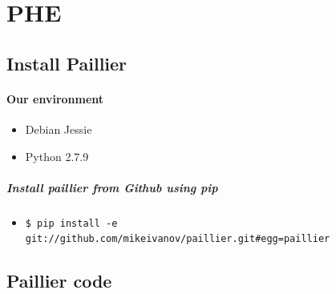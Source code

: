 \documentclass{article}
\begin{document}
 
 
 
 \section{PHE}
 
\subsection{Install Paillier}
 
\paragraph*{Our environment}
\begin{itemize}
\item Debian Jessie
\item  Python 2.7.9
\end{itemize}

\subparagraph{Install paillier from Github using pip}
\begin{itemize}
\item \verb|$ pip install -e git://github.com/mikeivanov/paillier.git#egg=paillier|
\end{itemize}

\subsection{Paillier code}
\end{document}
